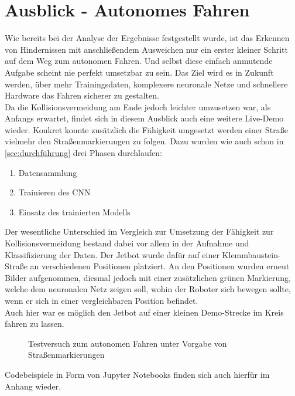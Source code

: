 \section{Ausblick - Autonomes Fahren} \label{sec:ausblick}

Wie bereits bei der Analyse der Ergebnisse festgestellt wurde, ist das Erkennen von Hindernissen mit anschließendem Ausweichen nur ein erster kleiner Schritt auf dem Weg zum autonomen Fahren. Und selbst diese einfach anmutende Aufgabe scheint nie perfekt umsetzbar zu sein. Das Ziel wird es in Zukunft werden, über mehr Trainingsdaten, komplexere neuronale Netze und schnellere Hardware das Fahren sicherer zu gestalten.\\
Da die Kollisionsvermeidung am Ende jedoch leichter umzusetzen war, als Anfangs erwartet, findet sich in diesem Ausblick auch eine weitere Live-Demo wieder. Konkret konnte zusätzlich die Fähigkeit umgesetzt werden einer Straße \bzw vielmehr den Straßenmarkierungen zu folgen. Dazu wurden wie auch schon in \autoref{sec:durchführung} drei Phasen durchlaufen:

\begin{enumerate}
    \item Datensammlung
    \item Trainieren des CNN
    \item Einsatz des trainierten Modells
\end{enumerate}

Der wesentliche Unterschied im Vergleich zur Umsetzung der Fähigkeit zur Kollisionsvermeidung bestand dabei vor allem in der Aufnahme und Klassifizierung der Daten. Der Jetbot wurde dafür auf einer Klemmbaustein-Straße an verschiedenen Positionen platziert. An den Positionen wurden erneut Bilder aufgenommen, diesmal jedoch mit einer zusätzlichen grünen Markierung, welche dem neuronalen Netz zeigen soll, wohin der Roboter sich bewegen sollte, wenn er sich in einer vergleichbaren Position befindet. \\
Auch hier war es möglich den Jetbot auf einer kleinen Demo-Strecke im Kreis fahren zu lassen.

\begin{figure}[H]
    \centering
    \caption[Folgen von Straßenmarkierungen]{Testversuch zum autonomen Fahren unter Vorgabe von Straßenmarkierungen}
    \label{fig:Bild6.1}
\end{figure}

Codebeispiele in Form von Jupyter Notebooks finden sich auch hierfür im Anhang wieder.